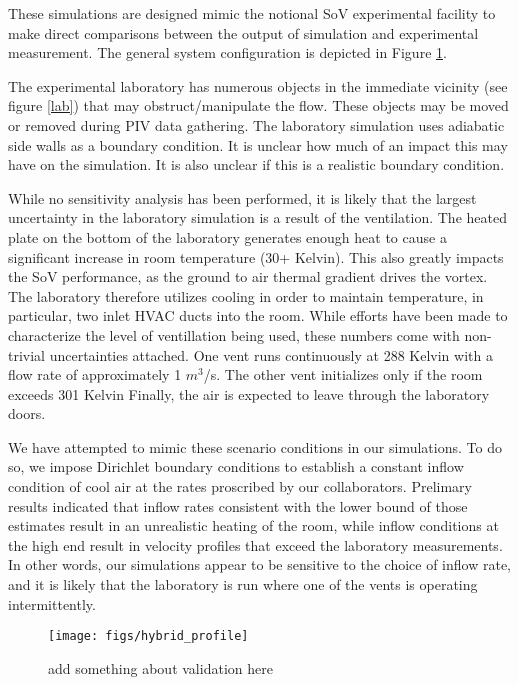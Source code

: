 
These simulations are designed mimic the notional SoV experimental
facility to make direct comparisons between the output of simulation and
experimental measurement. The general system configuration is depicted
in Figure \ref{fig:lab}. 

The experimental laboratory has numerous objects
in the immediate vicinity (see figure \ref{lab}) that may
obstruct/manipulate the flow. These objects may be moved or removed
during PIV data gathering. The laboratory simulation uses adiabatic side
walls as a boundary condition. It is unclear how much of an impact this
may have on the simulation. It is also unclear if this is a realistic
boundary condition. 

While no sensitivity analysis has been performed, it is likely that the
largest uncertainty in the laboratory simulation is a result of the
ventilation. The heated plate on the bottom of the laboratory
generates enough heat to cause a significant increase in room
temperature (30+ Kelvin). This also greatly impacts the SoV
performance, as the ground to air thermal gradient drives the
vortex. The laboratory therefore utilizes cooling in order to maintain
temperature, in particular, two inlet HVAC ducts into the room. While
efforts have been made to characterize the level of ventillation being
used, these numbers come with non-trivial uncertainties attached. One
vent runs continuously at 288 Kelvin with a flow rate of approximately 1 
$m^3$/s.
The other vent initializes only if the room exceeds 301 Kelvin
Finally, the air is expected to leave through the laboratory doors.

We have attempted to mimic these scenario conditions in our
simulations. To do so, we impose Dirichlet boundary conditions to
establish a constant inflow condition of cool air at the rates 
proscribed by our collaborators. Prelimary results indicated that 
inflow rates consistent with the lower bound of those estimates result in an
unrealistic heating of the room, while inflow conditions at the high end
result in velocity profiles that exceed the laboratory measurements. In
other words, our simulations appear to be sensitive to the choice of
inflow rate, and it is likely that the laboratory is run where one of
the vents is operating intermittently. 

  \begin{figure}[!htb]
    \begin{center}
     \texttt{[image: figs/hybrid\_profile]}
     \caption{add something about validation here}
     \label{fig:lab}
    \end{center}
  \end{figure}

